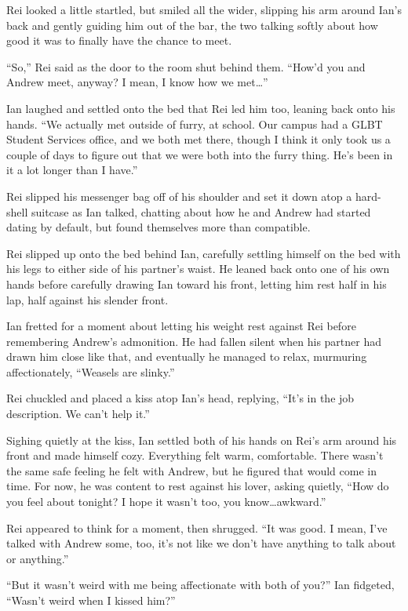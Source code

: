 Rei looked a little startled, but smiled all the wider, slipping his arm around Ian's back and gently guiding him out of the bar, the two talking softly about how good it was to finally have the chance to meet.

``So,'' Rei said as the door to the room shut behind them. ``How'd you and Andrew meet, anyway? I mean, I know how we met\ldots{}''

Ian laughed and settled onto the bed that Rei led him too, leaning back onto his hands. ``We actually met outside of furry, at school. Our campus had a GLBT Student Services office, and we both met there, though I think it only took us a couple of days to figure out that we were both into the furry thing. He's been in it a lot longer than I have.''

Rei slipped his messenger bag off of his shoulder and set it down atop a hard-shell suitcase as Ian talked, chatting about how he and Andrew had started dating by default, but found themselves more than compatible.

Rei slipped up onto the bed behind Ian, carefully settling himself on the bed with his legs to either side of his partner's waist. He leaned back onto one of his own hands before carefully drawing Ian toward his front, letting him rest half in his lap, half against his slender front.

Ian fretted for a moment about letting his weight rest against Rei before remembering Andrew's admonition. He had fallen silent when his partner had drawn him close like that, and eventually he managed to relax, murmuring affectionately, ``Weasels are slinky.''

Rei chuckled and placed a kiss atop Ian's head, replying, ``It's in the job description. We can't help it.''

Sighing quietly at the kiss, Ian settled both of his hands on Rei's arm around his front and made himself cozy. Everything felt warm, comfortable. There wasn't the same safe feeling he felt with Andrew, but he figured that would come in time.  For now, he was content to rest against his lover, asking quietly, ``How do you feel about tonight? I hope it wasn't too, you know\ldots{}awkward.''

Rei appeared to think for a moment, then shrugged. ``It was good. I mean, I've talked with Andrew some, too, it's not like we don't have anything to talk about or anything.''

``But it wasn't weird with me being affectionate with both of you?'' Ian fidgeted, ``Wasn't weird when I kissed him?''

